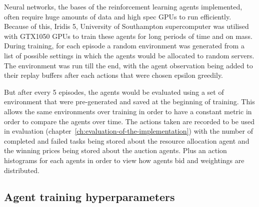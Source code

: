 Neural networks, the bases of the reinforcement learning agents implemented, often require huge amounts of data and
high spec GPUs to run efficiently. Because of this, Iridis 5, University of Southampton supercomputer was utilised with
GTX1050 GPUs to train these agents for long periods of time and on mass. During training, for each episode a random
environment was generated from a list of possible settings in which the agents would be allocated to random servers. The
environment was run till the end, with the agent observation being added to their replay buffers after each actions
that were chosen epsilon greedily.

But after every 5 episodes, the agents would be evaluated using a set of environment that were pre-generated and
saved at the beginning of training. This allows the same environments over training in order to have a constant metric
in order to compare the agents over time. The actions taken are recorded to be used in evaluation
(chapter~\ref{ch:evaluation-of-the-implementation}) with the number of completed and failed tasks being stored about
the resource allocation agent and the winning prices being stored about the auction agents. Plus an action histograms
for each agents in order to view how agents bid and weightings are distributed.


\subsection{Agent training hyperparameters}\label{subsec:agent-training-hyperparameters}


